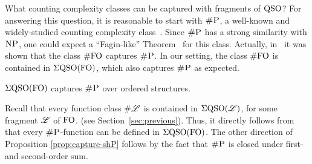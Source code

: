 What counting complexity classes can be captured with fragments of ${\rm QSO}$?
For answering this question, it is reasonable to start with $\text{\sc \#P}$, a well-known and widely-studied counting complexity class~\cite{arora2009computational}. 
Since $\text{\sc \#P}$ has a strong similarity with $\text{\sc NP}$, one could expect a ``Fagin-like'' Theorem~\cite{F75} for this class. 
Actually, in~\cite{SalujaST95} it was shown that the class $\#{\rm FO}$ captures $\text{\sc \#P}$.
In our setting, the class $\#{\rm FO}$ is contained in $\Sigma{\rm QSO}({\rm FO})$, which also captures $\text{\sc \#P}$ as expected. 
\begin{proposition} \label{prop:capture-shP}
	$\Sigma{\rm QSO}({\rm FO})$ captures $\text{\sc \#P}$ over ordered structures.
\end{proposition}
Recall  that every function class $\# \mathscr{L}$ is contained in $\Sigma{\rm QSO}(\mathscr{L})$, for some fragment $\mathscr{L}$ of ${\rm FO}$. (see Section~\ref{sec:previous}). Thus, it directly follows from~\cite{SalujaST95}  that every $\text{\sc \#P}$-function can be defined in $\Sigma{\rm QSO}({\rm FO})$. The other direction of Proposition \ref{prop:capture-shP} follows by the fact that $\text{\sc \#P}$ is closed under first- and second-order sum.

